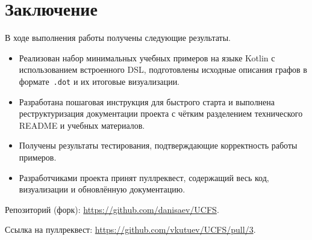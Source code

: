 \documentclass[a4paper]{article}
\begin{document}
\section{Заключение}

В ходе выполнения работы получены следующие результаты.

\begin{itemize}
    \item Реализован набор минимальных учебных примеров на языке Kotlin с использованием встроенного DSL, подготовлены исходные описания графов в формате~\texttt{.dot} и их итоговые визуализации.
    \item Разработана пошаговая инструкция для быстрого старта и выполнена реструктуризация документации проекта с чётким разделением технического README и учебных материалов.
    \item Получены результаты тестирования, подтверждающие корректность работы примеров.
    \item Разработчиками проекта принят пуллреквест, содержащий весь код, визуализации и обновлённую документацию.
\end{itemize}

Репозиторий (форк): \url{https://github.com/danisaev/UCFS}.

Ссылка на пуллреквест: \url{https://github.com/vkutuev/UCFS/pull/3}.
\end{document}
